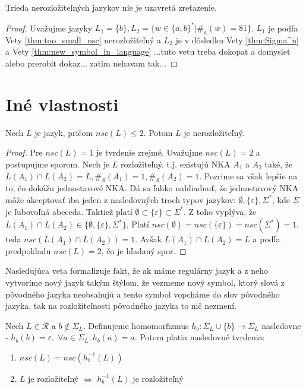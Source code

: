 \begin{theorem}
Trieda nerozložiteľných jazykov nie je uzavretá zreťazenie.
\end{theorem}

\begin{proof}
Uvažujme jazyky $ L_1 = \lbrace b \rbrace, L_2 = \lbrace w \in \lbrace a,b \rbrace^* | \#_a(w) = 81 \rbrace $. $ L_1 $ je podľa Vety \ref{thm:too_small_nsc} nerozložiteľný a $ L_2 $ je v dôsledku Vety \ref{thm:Sigma^n} a Vety \ref{thm:new_symbol_in_language} ...tuto vetu treba dokopat a domyslet alebo prerobit dokaz... zatim nehavam tak...
\end{proof}

\section{Iné vlastnosti}

\begin{theorem}
\label{thm:too_small_nsc}
Nech $ L $ je jazyk, pričom $ nsc(L) \leq 2 $. Potom $ L $ je nerozložiteľný.
\end{theorem}

\begin{proof}
Pre $ nsc(L) = 1 $ je tvrdenie zrejmé. Uvažujme $ nsc(L)=2 $ a postupujme sporom. Nech je $ L $ rozložiteľný, t.j. existujú NKA $ A_1 $ a $ A_2 $ také, že $ L(A_1) \cap L(A_2) = L, \#_S(A_1)=1, \#_S(A_2)=1 $. Pozrime sa však lepšie na to, čo dokážu jednostavové NKA. Dá sa ľahko nahliadnuť, že jednostavový NKA môže akceptovať iba jeden z nasledovných troch typov jazykov: $ \emptyset, \lbrace \varepsilon \rbrace, \Sigma^* $, kde $ \Sigma $ je ľubovoľná abeceda. Taktiež platí $ \emptyset \subset \lbrace \varepsilon \rbrace \subset \Sigma^* $. Z toho vyplýva, že $ L(A_1) \cap L(A_2) \in \lbrace \emptyset, \lbrace \varepsilon \rbrace, \Sigma^* \rbrace $. Platí $ nsc(\emptyset)=nsc(\lbrace \varepsilon \rbrace)=nsc(\Sigma^*)=1 $, teda $ nsc(L(A_1) \cap L(A_2))=1 $. Avšak $ L(A_1) \cap L(A_2) = L $ a podľa predpokladu $ nsc(L)=2 $, čo je hľadaný spor.
\end{proof}

Nasledujúca veta formalizuje fakt, že ak máme regulárny jazyk a z neho vytvoríme nový jazyk takým štýlom, že vezmeme nový symbol, ktorý slová z pôvodného jazyka neobsahujú a tento symbol \glqq{} vopcháme \grqq{} do slov pôvodného jazyka, tak na rozložiteľnosti pôvodného jazyka to nič nezmení.

\begin{theorem}
\label{thm:new_symbol_in_language}
Nech $ L \in \mathscr{R} $ a $ b \notin \Sigma_L $. Definujeme homomorfizmus $ h_b: \Sigma_L \cup \lbrace b \rbrace \rightarrow \Sigma_L $ nasledovne - $ h_b(b) = \varepsilon, \; \forall a \in \Sigma_L: h_b(a) = a $. Potom platia nasledovné tvrdenia:
\begin{enumerate}[label=(\alph*)]
\item \label{thm:new_symbol_in_language_item_1} $ nsc(L) = nsc(h_{b}^{-1}(L)) $
\item \label{thm:new_symbol_in_language_item_2} $ L $ je rozložiteľný $ \Leftrightarrow $ $ h_{b}^{-1}(L) $ je rozložiteľný
\end{enumerate}
\end{theorem}

